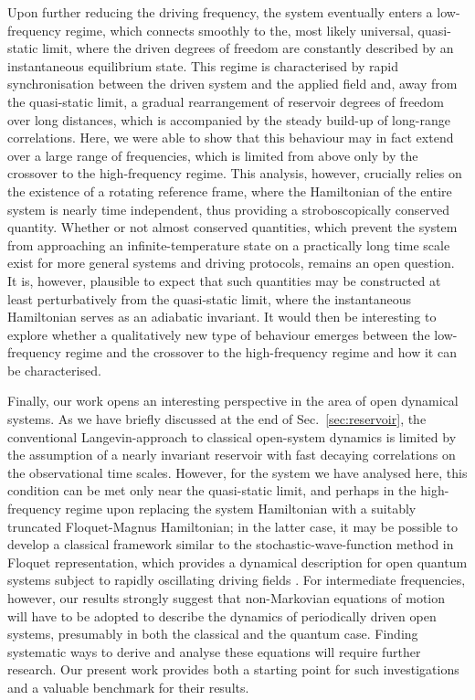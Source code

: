 \documentclass[aps,pre,twocolumn,notitlepage,floats,10pt]{revtex4-1}
\begin{document}
Upon further reducing the driving frequency, the system eventually enters a
low-frequency regime, which connects smoothly to the, most likely universal,
quasi-static limit, where the driven degrees of freedom are constantly described
by an instantaneous equilibrium state. 
This regime is characterised by rapid synchronisation between the driven system
and the applied field and, away from the quasi-static limit, a gradual
rearrangement of reservoir degrees of freedom over long distances, which is
accompanied by the steady build-up of long-range correlations. 
Here, we were able to show that this behaviour may in fact extend over a large
range of frequencies, which is limited from above only by the crossover to the
high-frequency regime. 
This analysis, however, crucially relies on the existence of a rotating
reference frame, where the Hamiltonian of the entire system is nearly time
independent, thus providing a stroboscopically conserved quantity. 
Whether or not almost conserved quantities, which prevent the system from
approaching an infinite-temperature state on a practically long time scale exist
for more general systems and driving protocols, remains an open question. 
It is, however, plausible to expect that such quantities may be constructed at
least perturbatively from the quasi-static limit, where the instantaneous
Hamiltonian serves as an adiabatic invariant. 
It would then be interesting to explore whether a qualitatively new type of
behaviour emerges between the low-frequency regime and the crossover to the
high-frequency regime and how it can be characterised. 

Finally, our work opens an interesting perspective in the area of open dynamical
systems. 
As we have briefly discussed at the end of Sec.~\ref{sec:reservoir}, the
conventional Langevin-approach to classical open-system dynamics is limited by
the assumption of a nearly invariant reservoir with fast decaying correlations
on the observational time scales. 
However, for the system we have analysed here, this condition can be met only
near the quasi-static limit, and perhaps in the high-frequency regime upon
replacing the system Hamiltonian with a suitably truncated Floquet-Magnus
Hamiltonian; in the latter case, it may be possible to develop a classical
framework similar to the stochastic-wave-function method in Floquet
representation, which provides a dynamical description for open quantum systems
subject to rapidly oscillating driving fields 
\cite{Breuer-Petruccione}. 
For intermediate frequencies, however, our results strongly suggest that
non-Markovian equations of motion will have to be adopted to describe the
dynamics of periodically driven open systems, presumably in both the classical
and the quantum case. 
Finding systematic ways to derive and analyse these equations will require
further research. Our present work provides both a starting point for such
investigations and a valuable benchmark for their results. 
\end{document}
